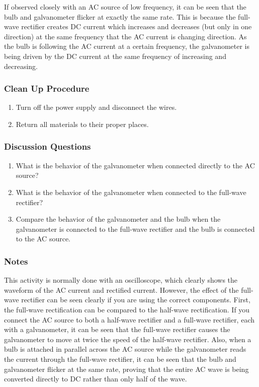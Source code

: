 If observed closely with an AC source of low frequency, it can be seen that the bulb and galvanometer flicker at exactly the same rate.  This is because the full-wave rectifier creates DC current which increases and decreases (but only in one direction) at the same frequency that the AC current is changing direction.  As the bulb is following the AC current at a certain frequency, the galvanometer is being driven by the DC current at the same frequency of increasing and decreasing.

\subsubsection*{Clean Up Procedure}
\begin{enumerate}
\item{Turn off the power supply and disconnect the wires.}
\item{Return all materials to their proper places.}
\end{enumerate}

\subsubsection*{Discussion Questions}
\begin{enumerate}
\item{What is the behavior of the galvanometer when connected directly to the AC source?}
\item{What is the behavior of the galvanometer when connected to the full-wave rectifier?}
\item{Compare the behavior of the galvanometer and the bulb when the galvanometer is connected to the full-wave rectifier and the bulb is connected to the AC source.}
\end{enumerate}

\subsubsection*{Notes}
This activity is normally done with an oscilloscope, which clearly shows the waveform of the AC current and rectified current.  However, the effect of the full-wave rectifier can be seen clearly if you are using the correct components.
First, the full-wave rectification can be compared to the half-wave rectification.  If you connect the AC source to both a half-wave rectifier and a full-wave rectifier, each with a galvanometer, it can be seen that the full-wave rectifier causes the galvanometer to move at twice the speed of the half-wave rectifier.
Also, when a bulb is attached in parallel across the AC source while the galvanometer reads the current through the full-wave rectifier, it can be seen that the bulb and galvanometer flicker at the same rate, proving that the entire AC wave is being converted directly to DC rather than only half of the wave.

